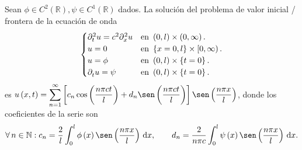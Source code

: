 \begin{theorem}
	Sean
	\begin{math}
		\phi\in
		C^{2}\left(\mathbb{R}\right),
		\psi\in
		C^{1}\left(\mathbb{R}\right)
	\end{math}
	dados.
	La solución del problema de valor inicial / frontera de la ecuación
	de onda
	\begin{equation*}
		\begin{cases}
			\difcp[2]{u}{t}=
			c^{2}\difcp[2]{u}{x} &
			\text{en }\left(0,l\right)\times\left(0,\infty\right).     \\
			u=0                  &
			\text{en }\left\{x=0,l\right\}\times\left[0,\infty\right). \\
			u=\phi               &
			\text{en }\left(0,l\right)\times\left\{t=0\right\}.        \\
			\difcp{u}{t}=\psi    &
			\text{en }\left(0,l\right)\times\left\{t=0\right\}.
		\end{cases}
	\end{equation*}
	es
	\begin{math}\displaystyle
		u\left(x,t\right)=
		\sum_{n=1}^{\infty}
		\left[
			c_{n}
			\cos\left(\frac{n\pi ct}{l}\right)+
			d_{n}
			\sen
			\left(\frac{n\pi ct}{l}\right)
			\right]
		\sen
		\left(\frac{n\pi x}{l}\right)
	\end{math},
	donde los coeficientes de la serie son
	\begin{equation*}
		\forall n\in\mathbb{N}:
		c_{n}=
		\frac{2}{l}
		\int_{0}^{l}
		\phi\left(x\right)
		\sen
		\left(\frac{n\pi x}{l}\right)\dl x,\qquad
		d_{n}=
		\frac{2}{n\pi c}
		\int_{0}^{l}
		\psi\left(x\right)
		\sen
		\left(\frac{n\pi x}{l}\right)\dl x.
	\end{equation*}
\end{theorem}

